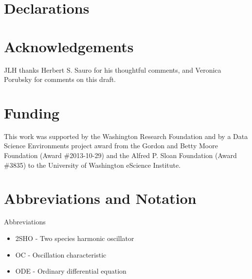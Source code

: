 \documentclass{bmcart}
\begin{document}
\section*{Declarations}
\begin{backmatter}

\section*{Acknowledgements}%
JLH thanks Herbert S. Sauro for his thoughtful comments, and Veronica Porubsky for comments on this draft.

\section*{Funding}%
This work was supported by the Washington Research Foundation and by a Data Science Environments project award from the Gordon and Betty Moore Foundation (Award \#2013-10-29) and the Alfred P. Sloan Foundation (Award \#3835) to the University of Washington eScience Institute.

\section*{Abbreviations and Notation}
Abbreviations
\begin{itemize}
\item 
2SHO - Two species harmonic oscillator
\item 
OC - Oscillation characteristic
\item ODE - Ordinary differential equation
\end{itemize}


\end{backmatter}
\end{document}
